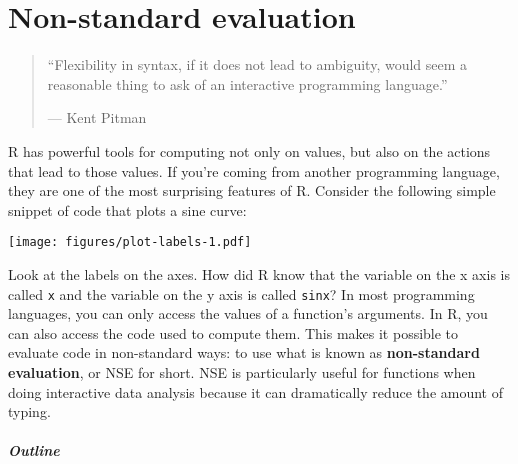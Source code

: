 \chapter{Non-standard evaluation}\label{nse}

\begin{quote}
``Flexibility in syntax, if it does not lead to ambiguity, would seem a
reasonable thing to ask of an interactive programming language.''

--- Kent Pitman
\end{quote}

R has powerful tools for computing not only on values, but also on the
actions that lead to those values. If you're coming from another
programming language, they are one of the most surprising features of R.
Consider the following simple snippet of code that plots a sine curve:

\begin{Shaded}
\begin{Highlighting}[]
\StringTok{ }\NormalTok{(}\NormalTok{, } \NormalTok{*}\StringTok{ } \NormalTok{)}
\StringTok{ }
 \NormalTok{)}
\end{Highlighting}
\end{Shaded}

\texttt{[image: figures/plot-labels-1.pdf]}

Look at the labels on the axes. How did R know that the variable on the
x axis is called \texttt{x} and the variable on the y axis is called
\texttt{sinx}? In most programming languages, you can only access the
values of a function's arguments. In R, you can also access the code
used to compute them. This makes it possible to evaluate code in
non-standard ways: to use what is known as \textbf{non-standard
evaluation}, or NSE for short. NSE is particularly useful for functions
when doing interactive data analysis because it can dramatically reduce
the amount of typing. 

\paragraph{Outline}

